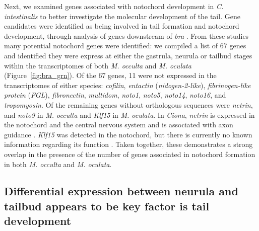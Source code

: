 Next, we examined genes associated with notochord development in \textit{C. intestinalis} to better investigate the molecular development of the tail. Gene candidates were identified as being involved in tail formation and notochord development, through analysis of genes downstream of \textit{bra} \cite{hotta_temporal_1999,hotta_characterization_2000,hotta_brachyury-downstream_2007,kugler_evolutionary_2008,kugler_evolutionary_2011}. From these studies many potential notochord genes were identified: we compiled a list of 67 genes and identified they were express at either the gastrula, neurula or tailbud stages within the %
transcriptomes of both \textit{M. occulta} and \textit{M. oculata} (Figure~\ref{fig:bra_grn}). Of the 67 genes, 11 were not expressed in the transcriptomes of either species: \textit{cofilin}, \textit{entactin} (\textit{nidogen-2-like}), \textit{fibrinogen-like protein} (\textit{FGL}), \textit{fibronectin}, \textit{multidom}, \textit{noto1}, \textit{noto5}, \textit{noto14}, \textit{noto16}, and \textit{tropomyosin}. Of the remaining genes without orthologous sequences were \textit{netrin}, and \textit{noto9} in \textit{M. occulta} and \textit{Klf15} in \textit{M. oculata}. In \textit{Ciona}, \textit{netrin} is expressed in the notochord and the central nervous system and is associated with axon guidance \cite{hotta_characterization_2000}. \textit{Klf15} was detected in the notochord, but there is currently no known information regarding its function \cite{passamaneck_direct_2009}. Taken together, these demonstrates a strong overlap in the presence of the number of genes associated in notochord formation in both \textit{M. occulta} and \textit{M. oculata}.

\subsection{Differential expression between neurula and tailbud appears to be key factor is tail development} 

